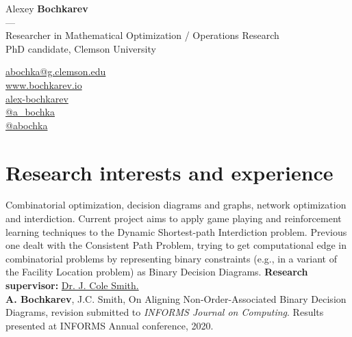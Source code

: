 \documentclass[11pt]{article} \usepackage{geometry} %
\begin{document}
  \begin{minipage}[c]{0.74\textwidth}
    \centering
    {\LARGE Alexey \textbf{Bochkarev}}\\
    ---\\ 
    Researcher in Mathematical Optimization / Operations Research\\
    PhD candidate, Clemson University
  \end{minipage}\hfill%
  \begin{minipage}{0.26\textwidth}
    \faEnvelope \href{mailto:abochka@g.clemson.edu}{abochka@g.clemson.edu}\\
    \faGlobe \href{https://www.bochkarev.io}{www.bochkarev.io}\\
    \faGithub \href{https://github.com/alex-bochkarev}{alex-bochkarev}\\
    \faTwitter \href{https://twitter.com/a_bochka}{@a\_bochka}\\
    \faTelegram \href{https://t.me/abochka}{@abochka}
  \end{minipage}

 \section*{Research interests and experience}
 Combinatorial optimization, decision diagrams and graphs, network optimization
 and interdiction. Current project aims to apply game playing and reinforcement
 learning techniques to the Dynamic Shortest-path Interdiction problem. Previous
 one dealt with the Consistent Path Problem, trying to get computational edge in
 combinatorial problems by representing binary constraints (e.g., in a variant
 of the Facility Location problem) as Binary Decision Diagrams.
 \textbf{Research supervisor:}
 \href{https://scholar.google.com/citations?user=87CaUHYAAAAJ&hl=en}{Dr. J. Cole
   Smith.}\vspace{0.5em}\\
 \faFile*[regular] \textbf{A. Bochkarev}, J.C. Smith, On Aligning
 Non-Order-Associated Binary Decision Diagrams, revision submitted to \textit{INFORMS
   Journal on
   Computing}. Results presented at INFORMS Annual conference, 2020.\\
\end{document}
